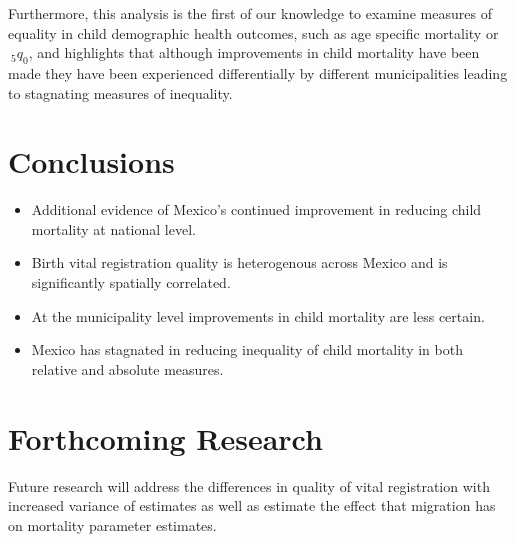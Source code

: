 \documentclass[a0,portrait]{a0poster}
\begin{document}
\begin{multicols}{2}
Furthermore, this analysis is the first of our knowledge to examine measures of equality in child demographic health outcomes, such as age specific mortality or$~_5q_{0}$, and highlights that although improvements in child mortality have been made they have been experienced differentially by different municipalities leading to stagnating measures of inequality.


\color{black} %

\section*{Conclusions}

\begin{itemize}
\item Additional evidence of Mexico's continued improvement in reducing child mortality at national level.
\item Birth vital registration quality is heterogenous across Mexico and is significantly spatially correlated.
\item At the municipality level improvements in child mortality are less certain.
\item Mexico has stagnated in reducing inequality of child mortality in both relative and absolute measures.
\end{itemize}

\color{DarkSlateGray} %


\section*{Forthcoming Research}

Future research will address the differences in quality of vital registration with increased variance of estimates as well as estimate the effect that migration has on mortality parameter estimates.



\end{multicols}
\end{document}
